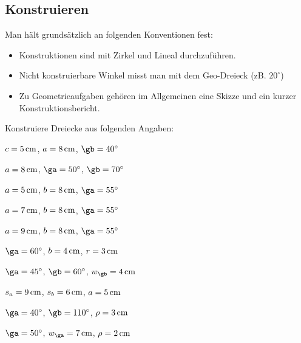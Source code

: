 \documentclass[%
11pt,%
twoside,%
titlepage,%
german,%
headsepline%
]{scrartcl}
\begin{document}
\subsection{Konstruieren}
Man hält grundsätzlich an folgenden Konventionen fest:
\begin{itemize}
\item Konstruktionen sind mit Zirkel und Lineal durchzuf\"uhren.
\item Nicht konstruierbare Winkel misst man mit dem Geo-Dreieck (zB. $20^\circ $)
\item Zu Geometrieaufgaben geh\"oren im Allgemeinen eine Skizze und ein kurzer Kon\-struk\-tions\-bericht.
\end{itemize}

\setcounter{ueb}{20}
\begin{ueb}
Konstruiere Dreiecke aus folgenden Angaben:

\begin{minipage}{0.5\textwidth}
    \begin{enumeratea}
      \item $c=\unit[5]{cm}$, $a=\unit[8]{cm}$, $\gb=40^\circ $
      \item $a=\unit[8]{cm}$, $\ga=50^\circ $, $\gb=70^\circ $
      \item $a=\unit[5]{cm}$, $b=\unit[8]{cm}$, $\ga=55^\circ $
      \item $a=\unit[7]{cm}$, $b=\unit[8]{cm}$, $\ga=55^\circ $
      \item $a=\unit[9]{cm}$, $b=\unit[8]{cm}$, $\ga=55^\circ $
    \end{enumeratea}
 \end{minipage}
 \begin{minipage}{0.4\textwidth}
 \begin{enumeratea}
 \setcounter{enumi}{5}
      \item $\ga=60^\circ $, $b=\unit[4]{cm}$, $r=\unit[3]{cm}$
      \item $\ga=45^\circ $, $\gb=60^\circ $, $w_{\gb}=\unit[4]{cm}$
      \item $s_a=\unit[9]{cm}$, $s_b=\unit[6]{cm}$, $a=\unit[5]{cm}$
      \item $\ga=40^\circ $, $\gb=110^\circ $, $\rho=\unit[3]{cm}$
      \item $\ga=50^\circ $, $w_{\ga}=\unit[7]{cm}$, $\rho=\unit[2]{cm}$
    \end{enumeratea}
\end{minipage}
\end{ueb}
\end{document}
